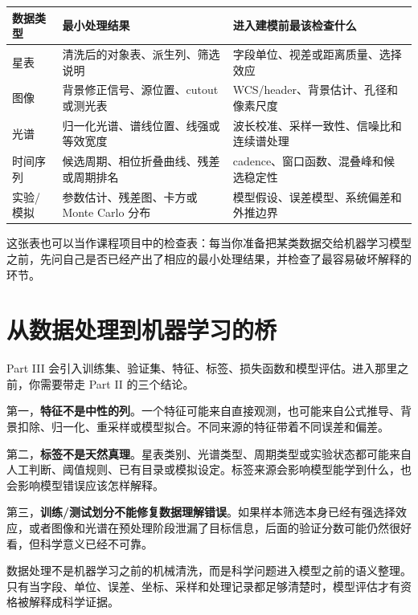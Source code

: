 \begin{center}
\begin{tabular}{p{} p{} p{}}
\toprule
数据类型 & 最小处理结果 & 进入建模前最该检查什么 \\
\midrule
星表 & 清洗后的对象表、派生列、筛选说明 & 字段单位、视差或距离质量、选择效应 \\
图像 & 背景修正信号、源位置、cutout 或测光表 & WCS/header、背景估计、孔径和像素尺度 \\
光谱 & 归一化光谱、谱线位置、线强或等效宽度 & 波长校准、采样一致性、信噪比和连续谱处理 \\
时间序列 & 候选周期、相位折叠曲线、残差或周期排名 & cadence、窗口函数、混叠峰和候选稳定性 \\
实验/模拟 & 参数估计、残差图、卡方或 Monte Carlo 分布 & 模型假设、误差模型、系统偏差和外推边界 \\
\bottomrule
\end{tabular}
\end{center}

这张表也可以当作课程项目中的检查表：每当你准备把某类数据交给机器学习模型之前，先问自己是否已经产出了相应的最小处理结果，并检查了最容易破坏解释的环节。

\section*{从数据处理到机器学习的桥}

Part III 会引入训练集、验证集、特征、标签、损失函数和模型评估。进入那里之前，你需要带走 Part II 的三个结论。

第一，\textbf{特征不是中性的列}。一个特征可能来自直接观测，也可能来自公式推导、背景扣除、归一化、重采样或模型拟合。不同来源的特征带着不同误差和偏差。

第二，\textbf{标签不是天然真理}。星表类别、光谱类型、周期类型或实验状态都可能来自人工判断、阈值规则、已有目录或模拟设定。标签来源会影响模型能学到什么，也会影响模型错误应该怎样解释。

第三，\textbf{训练/测试划分不能修复数据理解错误}。如果样本筛选本身已经有强选择效应，或者图像和光谱在预处理阶段泄漏了目标信息，后面的验证分数可能仍然很好看，但科学意义已经不可靠。

\begin{warnbox}
数据处理不是机器学习之前的机械清洗，而是科学问题进入模型之前的语义整理。只有当字段、单位、误差、坐标、采样和处理记录都足够清楚时，模型评估才有资格被解释成科学证据。
\end{warnbox}

